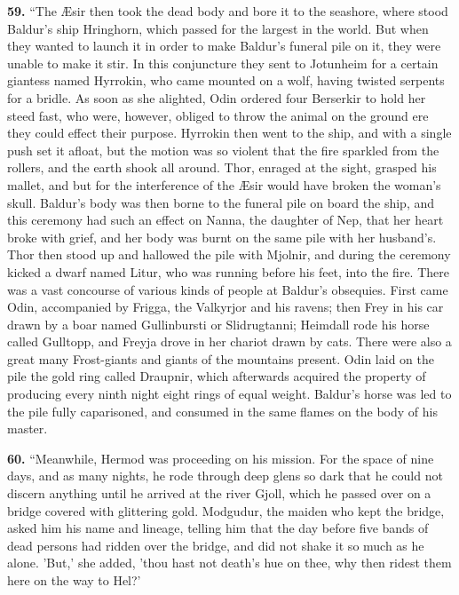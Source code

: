 \textbf{59.} ``The Æsir then took the dead body and bore it to the seashore,
where stood Baldur's ship Hringhorn, which passed for the largest in
the world. But when they wanted to launch it in order to make Baldur's
funeral pile on it, they were unable to make it stir. In this
conjuncture they sent to Jotunheim for a certain giantess named
Hyrrokin, who came mounted on a wolf, having twisted serpents for a
bridle. As soon as she alighted, Odin ordered four Berserkir to hold
her steed fast, who were, however, obliged to throw the animal on the
ground ere they could effect their purpose. Hyrrokin then went to the
ship, and with a single push set it afloat, but the motion was so
violent that the fire sparkled from the rollers, and the earth shook
all around. Thor, enraged at the sight, grasped his mallet, and but
for the interference of the Æsir would have broken the woman's skull.
Baldur's body was then borne to the funeral pile on board the ship,
and this ceremony had such an effect on Nanna, the daughter of Nep,
that her heart broke with grief, and her body was burnt on the same
pile with her husband's. Thor then stood up and hallowed the pile with
Mjolnir, and during the ceremony kicked a dwarf named Litur, who was
running before his feet, into the fire. There was a vast concourse of
various kinds of people at Baldur's obsequies. First came Odin,
accompanied by Frigga, the Valkyrjor and his ravens; then Frey in his
car drawn by a boar named Gullinbursti or Slidrugtanni; Heimdall rode
his horse called Gulltopp, and Freyja drove in her chariot drawn by
cats. There were also a great many Frost-giants and giants of the
mountains present. Odin laid on the pile the gold ring called
Draupnir, which afterwards acquired the property of producing every
ninth night eight rings of equal weight. Baldur's horse was led to the
pile fully caparisoned, and consumed in the same flames on the body
of his master.


\textbf{60.} ``Meanwhile, Hermod was proceeding on his mission. For the space
of nine days, and as many nights, he rode through deep glens so dark
that he could not discern anything until he arrived at the river
Gjoll, which he passed over on a bridge covered with glittering gold.
Modgudur, the maiden who kept the bridge, asked him his name and
lineage, telling him that the day before five bands of dead persons
had ridden over the bridge, and did not shake it so much as he alone.
'But,' she added, 'thou hast not death's hue on thee, why then ridest
them here on the way to Hel?'

